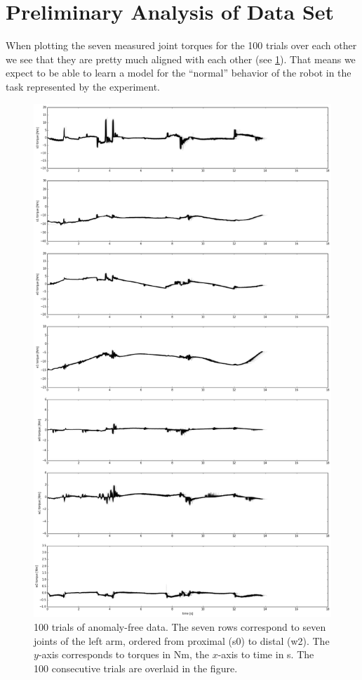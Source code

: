 \documentclass{scrartcl}
\begin{document}
\section{Preliminary Analysis of Data Set}
    When plotting the seven measured joint torques for the 100 trials over each other we see that they are pretty much aligned with each other (see \cref{fig:noanomaly}).
    That means we expect to be able to learn a model for the ``normal'' behavior of the robot in the task represented by the experiment.
    \begin{figure}
        \centering
        \includegraphics[width=.7\textwidth]{figs/no_anomaly3.png}
        \caption{100 trials of anomaly-free data.
            The seven rows correspond to seven joints of the left arm, ordered from proximal (s0) to distal (w2).
            The $y$-axis corresponds to torques in Nm, the $x$-axis to time in s.
            The 100 consecutive trials are overlaid in the figure.}
        \label{fig:noanomaly}
    \end{figure}
    
\end{document}
